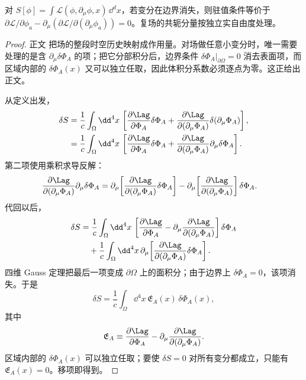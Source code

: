 \begin{theorem}
对 $S[\phi]=\int\mathcal L(\phi,\partial_\mu\phi,x)\,\dd^dx$，若变分在边界消失，则驻值条件等价于 $\partial\mathcal L/\partial\phi_a-\partial_\mu(\partial\mathcal L/\partial(\partial_\mu\phi_a))=0$。复场的共轭分量按独立实自由度处理。
\end{theorem}

\begin{proof}
正文 把场的整段时空历史映射成作用量。对场做任意小变分时，唯一需要处理的是含 $\partial_\mu\delta\Phi_A$ 的项；把它分部积分后，边界条件 $\delta\Phi_A|_{\partial\Omega}=0$ 消去表面项，而区域内部的 $\delta\Phi_A(x)$ 又可以独立任取，因此体积分系数必须逐点为零。这正给出正文。

从定义出发，
\begin{align*}
 \delta S
 &=\frac1c\int_\Omega\dd^4 x\,
 \left[
 \frac{\partial\Lag}{\partial\Phi_A}\delta\Phi_A
 +\frac{\partial\Lag}{\partial(\partial_\mu\Phi_A)}
 \delta(\partial_\mu\Phi_A)
 \right],\\
 &=\frac1c\int_\Omega\dd^4 x\,
 \left[
 \frac{\partial\Lag}{\partial\Phi_A}\delta\Phi_A
 +\frac{\partial\Lag}{\partial(\partial_\mu\Phi_A)}
 \partial_\mu\delta\Phi_A
 \right].
\end{align*}
第二项使用乘积求导反解：
\begin{align*}
 \frac{\partial\Lag}{\partial(\partial_\mu\Phi_A)}
 \partial_\mu\delta\Phi_A
 &=\partial_\mu\!\left[
 \frac{\partial\Lag}{\partial(\partial_\mu\Phi_A)}
 \delta\Phi_A\right]
 -\partial_\mu\!\left[
 \frac{\partial\Lag}{\partial(\partial_\mu\Phi_A)}\right]
 \delta\Phi_A.
\end{align*}
代回以后，
\begin{align*}
 \delta S
 &=\frac1c\int_\Omega\dd^4 x\,
 \left[
 \frac{\partial\Lag}{\partial\Phi_A}
 -\partial_\mu\frac{\partial\Lag}{\partial(\partial_\mu\Phi_A)}
 \right]\delta\Phi_A\\
 &\quad+\frac1c\int_\Omega\dd^4 x\,
 \partial_\mu\!\left[
 \frac{\partial\Lag}{\partial(\partial_\mu\Phi_A)}
 \delta\Phi_A\right].
\end{align*}
四维 Gauss 定理把最后一项变成 $\partial\Omega$ 上的面积分；由于边界上 $\delta\Phi_A=0$，该项消失。于是
\begin{equation*}
 \delta S
 =\frac1c\int_\Omega\dd^4 x\,
 \mathfrak E_A(x)\,\delta\Phi_A(x),
\end{equation*}
其中
\begin{equation*}
 \mathfrak E_A
 \equiv
 \frac{\partial\Lag}{\partial\Phi_A}
 -\partial_\mu\frac{\partial\Lag}{\partial(\partial_\mu\Phi_A)}.
\end{equation*}
区域内部的 $\delta\Phi_A(x)$ 可以独立任取；要使 $\delta S=0$ 对所有变分都成立，只能有 $\mathfrak E_A(x)=0$。移项即得到。
\end{proof}

